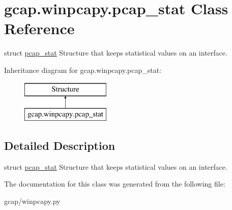 \hypertarget{classgcap_1_1winpcapy_1_1pcap__stat}{}\section{gcap.\+winpcapy.\+pcap\+\_\+stat Class Reference}
\label{classgcap_1_1winpcapy_1_1pcap__stat}


struct \hyperlink{classgcap_1_1winpcapy_1_1pcap__stat}{pcap\+\_\+stat} Structure that keeps statistical values on an interface.  


Inheritance diagram for gcap.\+winpcapy.\+pcap\+\_\+stat\+:\begin{figure}[H]
\begin{center}
\leavevmode
\includegraphics[height=2.000000cm]{d3/d20/classgcap_1_1winpcapy_1_1pcap__stat}
\end{center}
\end{figure}


\subsection{Detailed Description}
struct \hyperlink{classgcap_1_1winpcapy_1_1pcap__stat}{pcap\+\_\+stat} Structure that keeps statistical values on an interface. 



The documentation for this class was generated from the following file\+:\begin{DoxyCompactItemize}
\item 
gcap/winpcapy.\+py\end{DoxyCompactItemize}
